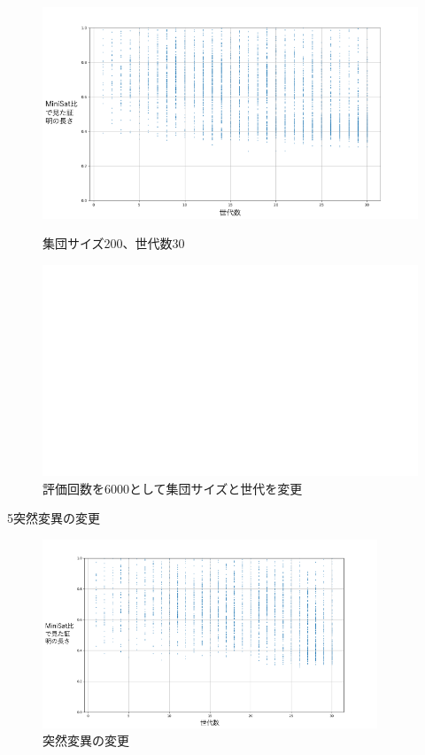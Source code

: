 \begin{figure}[h]
    \begin{minipage}{0.43\columnwidth}
        \centering
        \includegraphics[width=\columnwidth]{figures/Experiment1/4-3.png}
        \caption{集団サイズ200、世代数30}
        \label{fig:サンプルC}
    \end{minipage}
    \hspace{5mm}
    \begin{minipage}{0.43\columnwidth}
        \centering
        \includegraphics[width=\columnwidth]{figures/white.png}
    \end{minipage}
    \caption*{評価回数を6000として集団サイズと世代を変更}
\end{figure}

5突然変異の変更
\begin{figure}[h]
    \centering
    \includegraphics[width=10cm]{figures/Experiment1/5.png}
    \caption{突然変異の変更}
\end{figure}

